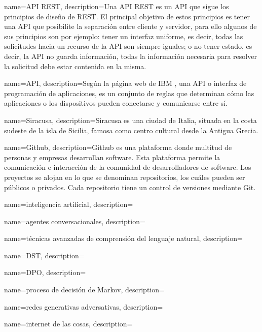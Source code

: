 {
    name=API REST,
    description={Una API REST es un \gls{API} que sigue los principios de diseño de REST. El principal objetivo de estos principios es tener una \gls{API} que posibilite la separación entre cliente y servidor, para ello algunos de sus principios son por ejemplo: tener un interfaz uniforme, es decir, todas las solicitudes hacia un recurso de la API son siempre iguales; o no tener estado, es decir, la API no guarda información, todas la información necesaria para resolver la solicitud debe estar contenida en la misma.}
}

{
    name=API,
    description={Según la página web de IBM \cite{RefWorks:RefID:33-2021-API}, una API o interfaz de programación de aplicaciones, es un conjunto de reglas que determinan cómo las aplicaciones o los dispositivos pueden conectarse y comunicarse entre sí.}
}

{
    name=Siracusa,
    description={Siracusa es una ciudad de Italia, situada en la costa sudeste de la isla de Sicilia, famosa como centro cultural desde la Antigua Grecia.}
}

{
    name=Github,
    description={Github es una plataforma donde multitud de personas y empresas desarrollan software. Esta plataforma permite la comunicación e interacción de la comunidad de desarrolladores de software. Los proyectos se alojan en lo que se denominan repositorios, los cuáles pueden ser públicos o privados. Cada repositorio tiene un control de versiones mediante Git.}
}


{
    name=inteligencia artificial,
    description={}
}


{
    name=agentes conversacionales,
    description={}
}

{
    name=técnicas avanzadas de comprensión del lenguaje natural,
    description={}
}

{
    name=DST,
    description={}
}

{
    name=DPO,
    description={}
}

{
    name=proceso de decisión de Markov,
    description={}
}

{
    name=redes generativas adversativas,
    description={}
}

{
    name=internet de las cosas,
    description={}
}

